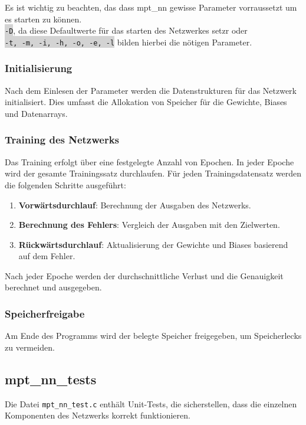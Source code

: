 \documentclass[a4paper, 12pt]{article}
\newcommand{\option}[1]{\colorbox{lightgray}{\texttt{#1}}}
\begin{document}
Es ist wichtig zu beachten, das dass mpt\_nn gewisse Parameter vorraussetzt um es starten zu können.\\
\option{-D}, da diese Defaultwerte für das starten des Netzwerkes setzr oder \\
\option{-t, -m, -i, -h, -o, -e, -l} bilden hierbei die nötigen Parameter.
\subsubsection{Initialisierung}

Nach dem Einlesen der Parameter werden die Datenstrukturen für das Netzwerk initialisiert. Dies umfasst die Allokation von Speicher für die Gewichte, Biases und Datenarrays.

\subsubsection{Training des Netzwerks}

Das Training erfolgt über eine festgelegte Anzahl von Epochen. In jeder Epoche wird der gesamte Trainingssatz durchlaufen. Für jeden Trainingsdatensatz werden die folgenden Schritte ausgeführt:

\begin{enumerate}
    \item \textbf{Vorwärtsdurchlauf}: Berechnung der Ausgaben des Netzwerks.
    \item \textbf{Berechnung des Fehlers}: Vergleich der Ausgaben mit den Zielwerten.
    \item \textbf{Rückwärtsdurchlauf}: Aktualisierung der Gewichte und Biases basierend auf dem Fehler.
\end{enumerate}

Nach jeder Epoche werden der durchschnittliche Verlust und die Genauigkeit berechnet und ausgegeben.

\subsubsection{Speicherfreigabe}

Am Ende des Programms wird der belegte Speicher freigegeben, um Speicherlecks zu vermeiden.

\subsection{mpt\_nn\_tests}
\label{subsec:mpt_nn_tests}

Die Datei \texttt{mpt\_nn\_test.c} enthält Unit-Tests, die sicherstellen, dass die einzelnen Komponenten des Netzwerks korrekt funktionieren.
\end{document}
